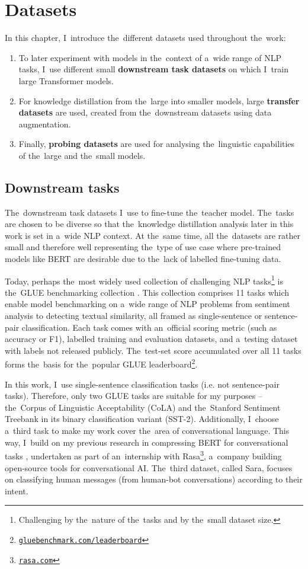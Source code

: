 \documentclass[bsc,frontabs,singlespacing,parskip,deptreport]{infthesis}
\newcommand\rurl[1]{%
  \href{https://#1}{\nolinkurl{#1}}%
}
\begin{document}
\chapter{Datasets}{
  \label{chap:datasets}

  In this chapter, I~introduce the~different datasets used throughout the~work:
  \begin{enumerate}
    \item To later experiment with models in the~context of a~wide range of NLP tasks, I~use different small \textbf{downstream task datasets} on which I~train large Transformer models.
    \item For knowledge distillation from the~large into smaller models, large \textbf{transfer datasets} are used, created from the~downstream datasets using data augmentation.
    \item Finally, \textbf{probing datasets} are used for analysing the~linguistic capabilities of the~large and the~small models.
  \end{enumerate}

  \section{Downstream tasks}{
    The~downstream task datasets I~use to fine-tune the~teacher model. The~tasks are chosen to be diverse so that the~knowledge distillation analysis later in this work is set in a~wide NLP context. At the~same time, all the~datasets are rather small and therefore well representing the~type of use case where pre-trained models like BERT are desirable due to the~lack of labelled fine-tuning data.

    Today, perhaps the~most widely used collection of challenging NLP tasks\footnote{Challenging by the~nature of the~tasks and by the~small dataset size.} is the~GLUE benchmarking collection \citep{Wang_2018}.
    This collection comprises 11 tasks which enable model benchmarking on a~wide range of NLP problems from sentiment analysis to detecting textual similarity, all framed as single-sentence or sentence-pair classification.
    Each task comes with an~official scoring metric (such as accuracy or F1), labelled training and evaluation datasets, and a~testing dataset with labels not released publicly.
    The~test-set score accumulated over all 11 tasks forms the~basis for the~popular GLUE leaderboard\footnote{\rurl{gluebenchmark.com/leaderboard}}.
    
    In this work, I~use single-sentence classification tasks (i.e. not sentence-pair tasks). Therefore, only two GLUE tasks are suitable for my purposes -- the~Corpus of Linguistic Acceptability (CoLA) and the~Stanford Sentiment Treebank in its binary classification variant (SST-2). 
    Additionally, I~choose a~third task to make my work cover the~area of conversational language. This way, I~build on my previous research in compressing BERT for conversational tasks \citep{Sucik_2019}, undertaken as part of an~internship with Rasa\footnote{\rurl{rasa.com}}, a~company building open-source tools for conversational AI. The~third dataset, called Sara, focuses on classifying human messages (from human-bot conversations) according to their intent.

}}
\end{document}
